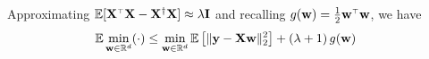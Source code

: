 \documentclass[11pt]{article}
\begin{document}
Approximating $\E[\X^\top \X - \X^\dag \X] \approx \lambda \I$ and
recalling $g(\w) = \frac{1}{2} \w^\top \w$, we have
\begin{align*}
  \mathbb E \min_{\mathbf w \in \mathbb{R}^d} (\cdot)
  &\leq \min_{\mathbf w \in \mathbb{R}^d} \mathbb E\left[
    \|\mathbf y - \mathbf X \mathbf w\|_2^2
  \right]
  + \left(\lambda + 1\right)g(\mathbf w)
\end{align*}



\end{document}
